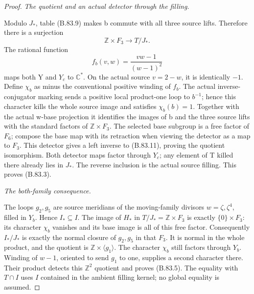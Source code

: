 \begin{proof}
\emph{The quotient and an actual detector through the filling.}\par
Modulo \(J_*\), table (B.83.9) makes b commute with all three
source lifts. Therefore there is a surjection
\[
                 \mathbb Z\times F_3\longrightarrow T/J_*.
\tag{B.83.11}
\]
The rational function
\[
                    f_b(v,w)=\frac{vw-1}{(w-1)^2}
\tag{B.83.12}
\]
maps both Y and \(Y_c\) to \(\mathbb C^*\). On the actual
source \(v=2-w\), it is identically \(-1\). Define \(\chi_b\) as minus the conventional positive winding
of \(f_b\). The actual inverse-conjugator marking sends a
positive local product-one loop to \(b^{-1}\); hence this
character kills the whole source image and satisfies
\(\chi_b(b)=1\).
Together with the actual w-base projection it identifies the
images of b and the three source lifts with the standard factors
of \(\mathbb Z\times F_3\). The selected base subgroup is a
free factor of \(F_6\); compose the base map with its retraction
when viewing the detector as a map to \(F_3\).
This detector gives a left inverse to
(B.83.11), proving the quotient isomorphism. Both detector
maps factor through \(Y_c\); any element of T killed there
already lies in \(J_*\). The reverse inclusion is the actual
source filling. This proves (B.83.3).

\emph{The both-family consequence.}\par
The loops \(g_2,g_5\) are source meridians of the moving-family
divisors \(w=\zeta,\zeta^4\), filled in \(Y_b\). Hence
\(I_*\subseteq I\). The image of \(H_*\) in
\(T/J_*=\mathbb Z\times F_3\) is exactly \(\{0\}\times F_3\):
its character \(\chi_b\) vanishes and its base image is all
of this free factor. Consequently \(I_*/J_*\) is exactly
the normal closure of \(g_2,g_5\) in that \(F_3\). It is
normal in the whole product, and the quotient is
\(\mathbb Z\times\langle g_1\rangle\).
The character \(\chi_b\) still factors through \(Y_b\).
Winding of \(w-1\), oriented to send \(g_1\) to one, supplies
a second character there. Their product detects this
\(\mathbb Z^2\) quotient and proves (B.83.5).
The equality with \(T\cap I\) uses \(I\) contained in the
ambient filling kernel; no global equality is assumed.


\end{proof}
